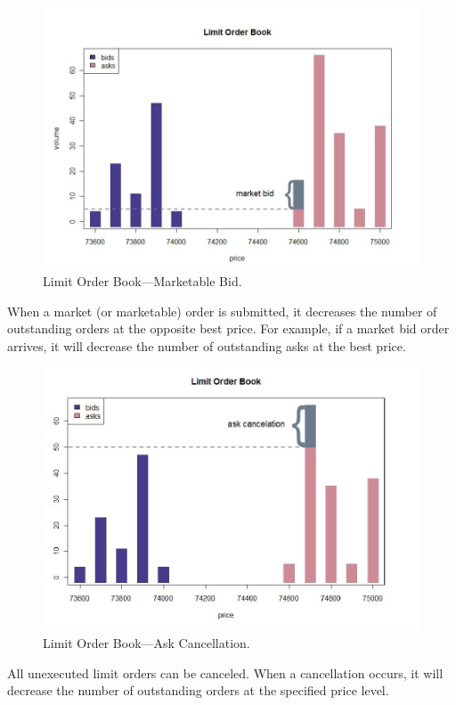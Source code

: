 	\begin{figure}[!ht]
	   \centering
	   \includegraphics[width=\textwidth]{chapters/chapter_trading_fund/figures/limitbk2.png} 
	   \caption{Limit Order Book---Marketable Bid. \label{fig:limbk2}}
	\end{figure}
	
When a market (or marketable) order is submitted, it decreases the number of outstanding orders at the opposite best price. For example, if a market bid order arrives, it will decrease the number of outstanding asks at the best price.
	\begin{figure}[!ht]
	   \centering
	   \includegraphics[width=\textwidth]{chapters/chapter_trading_fund/figures/limitbk3.png} 
	   \caption{Limit Order Book---Ask Cancellation. \label{fig:limbk3}}
	\end{figure}
All unexecuted limit orders can be canceled. When a cancellation occurs, it will decrease the number of outstanding orders at the specified price level.\\


